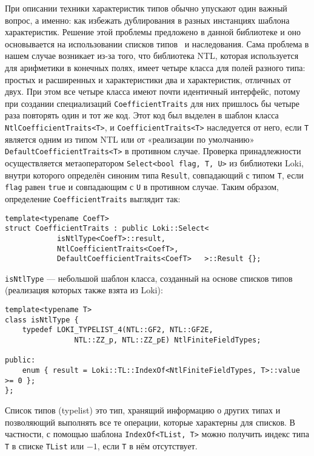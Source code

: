 \documentclass[14pt]{extarticle}
\begin{document}
При описании техники характеристик типов обычно упускают один важный вопрос, а
именно: как избежать дублирования в разных инстанциях шаблона характеристик.
Решение этой проблемы предложено в данной библиотеке и оно основывается на
использовании списков типов~\cite[гл. 3]{Alexandrescu02} и наследования. Сама
проблема в нашем случае возникает из-за того, что библиотека NTL, которая 
используется для арифметики в конечных полях, имеет четыре класса для полей
разного типа: простых и расширенных и характеристики два и характеристик,
отличных от двух. При этом все четыре класса имеют почти идентичный интерфейс,
потому при создании специализаций \lstinline$CoefficientTraits$ для них пришлось
бы четыре раза повторять один и тот же код. Этот код был выделен в
шаблон класса \lstinline$NtlCoefficientTraits<T>$, и
\lstinline$CoefficientTraits<T>$ наследуется от него, если \lstinline$T$
является одним из типом NTL или от «реализации по умолчанию»
\lstinline$DefaultCoefficientTraits<T>$ в противном случае. Проверка
принадлежности осуществляется метаоператором 
\lstinline$Select<bool flag, T, U>$ из библиотеки Loki, внутри которого
определён синоним типа \lstinline$Result$, совпадающий с типом \lstinline$T$,
если \lstinline$flag$ равен \lstinline$true$ и совпадающим с \lstinline$U$ в
противном случае. Таким образом, определение \lstinline$CoefficientTraits$
выглядит так:
\begin{lstlisting}
template<typename CoefT>
struct CoefficientTraits : public Loki::Select<
            isNtlType<CoefT>::result,
            NtlCoefficientTraits<CoefT>,
            DefaultCoefficientTraits<CoefT>   >::Result {};
\end{lstlisting}
\lstinline$isNtlType$ — небольшой шаблон класса, созданный на основе списков
типов (реализация которых также взята из Loki):
\begin{lstlisting}
template<typename T>
class isNtlType {
    typedef LOKI_TYPELIST_4(NTL::GF2, NTL::GF2E, 
                NTL::ZZ_p, NTL::ZZ_pE) NtlFiniteFieldTypes;

public:
    enum { result = Loki::TL::IndexOf<NtlFiniteFieldTypes, T>::value >= 0 };
};
\end{lstlisting}
Список типов (typelist) это тип, хранящий информацию о других типах и
позволяющий выполнять все те операции, которые характерны для списков. В
частности, с помощью шаблона \lstinline$IndexOf<TList, T>$ можно получить индекс
типа \lstinline$T$ в списке \lstinline$TList$ или $-1$, если \lstinline$T$ в нём
отсутствует.
\end{document}
